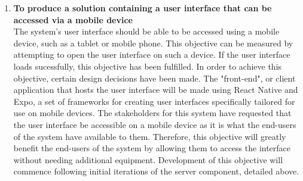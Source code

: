 \documentclass[../../../main.tex]{subfiles}
\begin{document}
\begin{enumerate}
      \item \textbf{To produce a solution containing a user interface that can be accessed via a mobile device}\\
            The system's user interface should be able to be accessed using a mobile device, such as a tablet
            or mobile phone. This objective can be measured by attempting to open the user interface on such a device.
            If the user interface loads sucessfully, this objective has been fulfilled. In order to achieve this objective,
            certain design decisions have been made. The "front-end", or client application that hosts the user interface
            will be made using React Native and Expo, a set of frameworks for creating user interfaces specifically
            tailored for use on mobile devices. The stakeholders for this system have requested that the user interface
            be accessible on a mobile device as it is what the end-users of the system have available to them.
            Therefore, this objective will greatly benefit the end-users of the system by allowing them to access the interface
            without needing additional equipment. Development of this objective will commence following initial
            iterations of the server component, detailed above.



\end{enumerate}
\end{document}

